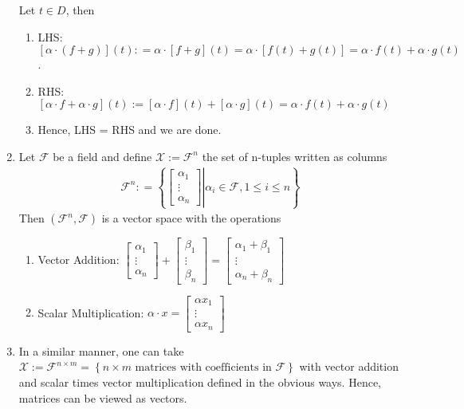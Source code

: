 \begin{example}
\begin{enumerate}
\begin{itemize}
            \end{itemize}
            Let $t \in D$, then 
               \begin{enumerate}
            \item LHS: $[\alpha \cdot (f+g)](t): = \alpha \cdot[f + g](t) = \alpha \cdot [f(t) + g(t)] = \alpha \cdot f(t) + \alpha \cdot g(t)$.
            \item RHS: $[\alpha \cdot f + \alpha \cdot g](t):= [\alpha \cdot f](t) + [ \alpha \cdot g](t) = \alpha \cdot f(t) + \alpha \cdot g(t)$
            \item Hence, LHS = RHS and we are done.
            \end{enumerate}
        \item Let $\mathcal{F}$ be a field and define $\mathcal{X}:=\mathcal{F}^n$ the set of n-tuples written as columns
        \begin{align*}
            \mathcal{F}^n: = \left\{\left.\begin{bmatrix} \alpha_1 \\ \vdots \\ \alpha_n \end{bmatrix} \right| \alpha_i \in \mathcal{F}, 1 \leq i \leq n\right\}
        \end{align*}
        Then $(\mathcal{F}^n, \mathcal{F})$ is a vector space with the operations
        \begin{enumerate}
            \item Vector Addition: $\begin{bmatrix} \alpha_1 \\ \vdots \\ \alpha_n \end{bmatrix} + \begin{bmatrix} \beta_1 \\ \vdots \\ \beta_n \end{bmatrix} = \begin{bmatrix} \alpha_1 + \beta_1 \\ \vdots \\ \alpha_n + \beta_n \end{bmatrix}$
            \item Scalar Multiplication: $\alpha\cdot x = \begin{bmatrix} \alpha x_1 \\ \vdots \\ \alpha x_n \end{bmatrix}$
        \end{enumerate}
        \item In a similar manner, one can take $\mathcal{X} := \mathcal{F}^{n\times m} = \left\{n\times m \mbox{ matrices with coefficients in } \mathcal{F}\right\}$ with vector addition and scalar times vector multiplication defined in the obvious ways. Hence, matrices can be viewed as vectors. 
        

\end{enumerate}
\end{example}
